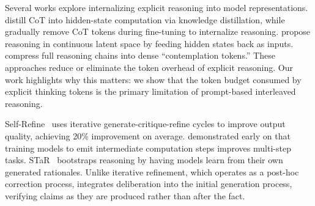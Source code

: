 Several works explore internalizing explicit reasoning into model representations. \citet{deng2023implicit} distill CoT into hidden-state computation via knowledge distillation, while \citet{deng2024explicit} gradually remove CoT tokens during fine-tuning to internalize reasoning. \citet{hao2024coconut} propose reasoning in continuous latent space by feeding hidden states back as inputs. \citet{cheng2024compressed} compress full reasoning chains into dense ``contemplation tokens.'' These approaches reduce or eliminate the token overhead of explicit reasoning. Our work highlights why this matters: we show that the token budget consumed by explicit thinking tokens is the primary limitation of prompt-based interleaved reasoning.

Self-Refine~\cite{madaan2023selfrefine} uses iterative generate-critique-refine cycles to improve output quality, achieving 20\% improvement on average. \citet{nye2021scratchpads} demonstrated early on that training models to emit intermediate computation steps improves multi-step tasks. STaR~\cite{zelikman2022star} bootstraps reasoning by having models learn from their own generated rationales. Unlike iterative refinement, which operates as a post-hoc correction process, \sentthink integrates deliberation into the initial generation process, verifying claims as they are produced rather than after the fact.
